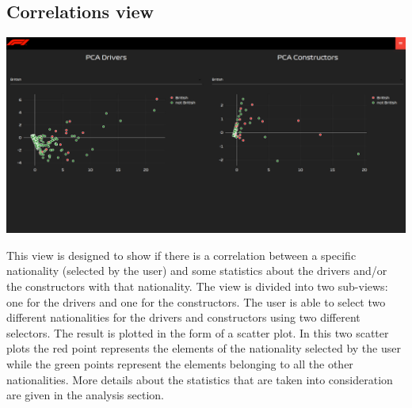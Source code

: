 \documentclass[11pt,twocolumn,letterpaper]{article}
\begin{document}
\subsection{Correlations view}
\begin{center}
	\centering
	\includegraphics[width=\columnwidth]{correlations}
\end{center}
This view is designed to show if there is a correlation between a specific nationality (selected by the user) and some statistics about the drivers and/or the constructors with that nationality. The view is divided into two sub-views: one for the drivers and one for the constructors. The user is able to select two different nationalities for the drivers and constructors using two different selectors. The result is plotted in the form of a scatter plot. In this two scatter plots the red point represents the elements of the nationality selected by the user while the green points represent the elements belonging to all the other nationalities. More details about the statistics that are taken into consideration are given in the analysis section.
\end{document}
